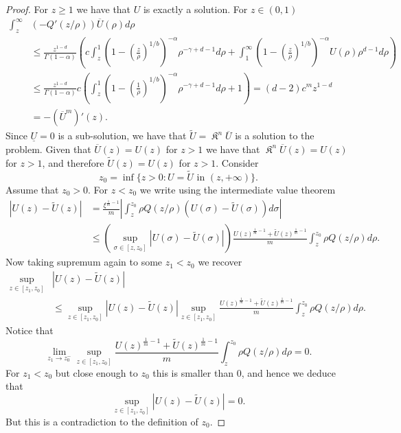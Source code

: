 \documentclass[a4paper]{article}
\theoremstyle{definition}
\DeclareMathOperator{\fixedpoint}{\mathfrak K}
\begin{document}
\begin{proof}
For $z \ge 1$ we have that $U$ is exactly a solution. For $z \in (0,1)$
\begin{align*}
  \int_z^\infty & (-Q'(z/\rho) )\overline{ U} (\rho) d \rho
  \\
  & \le \frac{z^{1-d}}{\Gamma(1-\alpha)}\left( c\int_z^1 (1-\left(\tfrac{z}{\rho}\right)^{1/b})^{-\alpha} \rho^{-\gamma+d-1} d \rho +\int_1^\infty (1-\left(\tfrac{z}{\rho}\right)^{1/b})^{-\alpha} U(\rho) \rho^{d-1}d\rho \right)
  \\
  & \le \frac{z^{1-d}}{\Gamma(1-\alpha)} c  \left(\int_z^1 (1-\left(\tfrac{1}{\rho}\right)^{1/b})^{-\alpha} \rho^{-\gamma+d-1} d \rho + 1\right) =
  (d-2) c^m z^{1-d}
  \\
  & = -(\overline{ U}^m)'(z).
\end{align*}
Since $\underline{ U} = 0$ is a sub-solution, we have that $\widetilde U = \fixedpoint^n \overline{ U}$ is a solution to the problem. Given that $\overline{ U} (z) = U(z)$ for $z > 1$ we have that $\fixedpoint^n \overline{ U}(z) = U(z)$ for $z > 1$, and therefore
$\widetilde U(z) = U(z)$ for $z > 1$.
Consider
\[
  z_0 = \inf\{ z > 0 : U = \widetilde U \text{ in } (z,+\infty) \}.
\]
Assume that $z_0 > 0$. For $z < z_0$ we write using the intermediate value theorem
\begin{align*}
  |U(z) - \widetilde U(z)| & = \frac {\xi^{\frac 1 m - 1}}{m} \left| \int_z^{z_0} \rho Q(z/\rho) (U(\sigma) - \widetilde U(\sigma)) d \sigma \right|                                                          \\
  & \le \left(\sup_{\sigma \in [z,z_0]} |U(\sigma) - \widetilde U(\sigma)|\right) \frac{ U(z)^{\frac 1 m - 1} + \widetilde U(z)^{\frac 1 m - 1}} m \int_{z}^{z_0} \rho Q(z/\rho) d \rho.
\end{align*}
Now taking supremum again to some $z_1 < z_0$ we recover
\begin{align*}
  \sup_{z \in [z_1,z_0]} & |U(z) - \widetilde U(z)|
  \\
  & \le \sup_{z \in [z_1,z_0]} |U(z) - \widetilde U(z)|  \sup_{z \in [z_1,z_0]} \frac{U(z)^{\frac 1 m - 1} + \widetilde U(z)^{\frac 1 m - 1}}{m} \int_{z}^{z_0} \rho Q(z/\rho) d \rho.
\end{align*}
Notice that
\begin{equation*}
  \lim_{z_1 \to z_0^-} \sup_{z \in [z_1,z_0]} \frac{U(z)^{\frac 1 m - 1} + \widetilde U(z)^{\frac 1 m - 1}}{m} \int_{z}^{z_0} \rho Q(z/\rho) d \rho = 0.
\end{equation*}
For $z_1 < z_0$ but close enough to $z_0$ this is smaller than $0$, and hence we deduce that
\[
  \sup_{z \in [z_1,z_0]} |U(z) - \widetilde U(z)| = 0.
\]
But this is a contradiction to the definition of $z_0$.
\end{proof}
\end{document}
